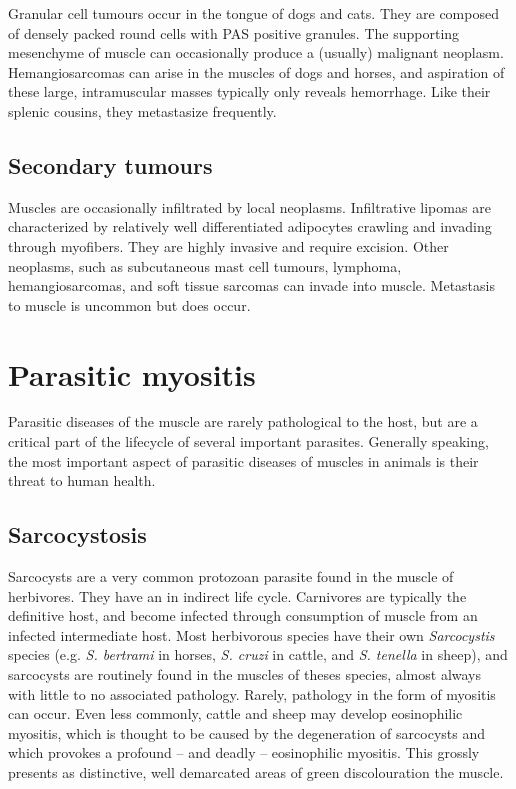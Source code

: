 \documentclass[openany]{report}
\begin{document}
Granular cell tumours occur in the tongue of dogs and cats. They are
composed of densely packed round cells with PAS positive granules. The
supporting mesenchyme of muscle can occasionally produce a (usually)
malignant neoplasm. Hemangiosarcomas can arise in the muscles of dogs
and horses, and aspiration of these large, intramuscular masses
typically only reveals hemorrhage. Like their splenic cousins, they
metastasize frequently.

\section{Secondary tumours}\label{secondary-tumours}

Muscles are occasionally infiltrated by local neoplasms. Infiltrative
lipomas are characterized by relatively well differentiated adipocytes
crawling and invading through myofibers. They are highly invasive and
require excision. Other neoplasms, such as subcutaneous mast cell
tumours, lymphoma, hemangiosarcomas, and soft tissue sarcomas can invade
into muscle. Metastasis to muscle is uncommon but does occur.

\chapter{Parasitic myositis}\label{parasitic-myositis}

Parasitic diseases of the muscle are rarely pathological to the host,
but are a critical part of the lifecycle of several important parasites.
Generally speaking, the most important aspect of parasitic diseases of
muscles in animals is their threat to human health.

\hypertarget{sarcocystosis}{\section{Sarcocystosis}\label{sarcocystosis}}

Sarcocysts are a very common protozoan parasite found in the muscle of
herbivores. They have an in indirect life cycle. Carnivores are
typically the definitive host, and become infected through consumption
of muscle from an infected intermediate host. Most herbivorous species
have their own \emph{Sarcocystis} species (e.g. \emph{S. bertrami} in
horses, \emph{S. cruzi} in cattle, and \emph{S. tenella} in sheep), and
sarcocysts are routinely found in the muscles of theses species, almost
always with little to no associated pathology. Rarely, pathology in the
form of myositis can occur. Even less commonly, cattle and sheep may
develop eosinophilic myositis, which is thought to be caused by the
degeneration of sarcocysts and which provokes a profound -- and deadly
-- eosinophilic myositis. This grossly presents as distinctive, well
demarcated areas of green discolouration the muscle.
\end{document}
